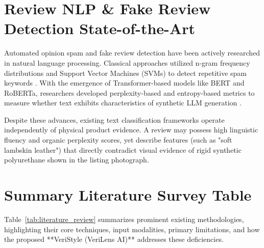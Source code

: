 \documentclass[a4paper,12pt]{report}
\begin{document}
\section{Review NLP & Fake Review Detection State-of-the-Art}
Automated opinion spam and fake review detection have been actively researched in natural language processing. Classical approaches utilized n-gram frequency distributions and Support Vector Machines (SVMs) to detect repetitive spam keywords \cite{jindal2008opinion}. With the emergence of Transformer-based models like BERT and RoBERTa, researchers developed perplexity-based and entropy-based metrics to measure whether text exhibits characteristics of synthetic LLM generation \cite{devlin2018bert, zhang2023nlp}.

Despite these advances, existing text classification frameworks operate independently of physical product evidence. A review may possess high linguistic fluency and organic perplexity scores, yet describe features (such as "soft lambskin leather") that directly contradict visual evidence of rigid synthetic polyurethane shown in the listing photograph.

\section{Summary Literature Survey Table}
Table~\ref{tab:literature_review} summarizes prominent existing methodologies, highlighting their core techniques, input modalities, primary limitations, and how the proposed **VeriStyle (VeriLens AI)** addresses these deficiencies.
\end{document}
